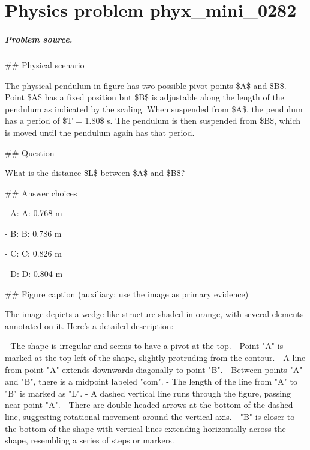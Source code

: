 
\chapter{Physics problem phyx\_mini\_0282}
\label{ch:PhyXMiniProblems_problem_phyx_mini_0282}

\paragraph{Problem source.}
\#\# Physical scenario

The physical pendulum in figure has two possible pivot points \$A\$ and \$B\$. Point \$A\$ has a fixed position but \$B\$ is adjustable along the length of the pendulum as indicated by the scaling. When suspended from \$A\$, the pendulum has a period of \$T = 1.80\$ s. The pendulum is then suspended from \$B\$, which is moved until the pendulum again has that period.

\#\# Question

What is the distance \$L\$ between \$A\$ and \$B\$?

\#\# Answer choices

- A: A: 0.768 m

- B: B: 0.786 m

- C: C: 0.826 m

- D: D: 0.804 m

\#\# Figure caption (auxiliary; use the image as primary evidence)

The image depicts a wedge-like structure shaded in orange, with several elements annotated on it. Here’s a detailed description:

- The shape is irregular and seems to have a pivot at the top.
- Point "A" is marked at the top left of the shape, slightly protruding from the contour.
- A line from point "A" extends downwards diagonally to point "B".
- Between points "A" and "B", there is a midpoint labeled "com".
- The length of the line from "A" to "B" is marked as "L".
- A dashed vertical line runs through the figure, passing near point "A".
- There are double-headed arrows at the bottom of the dashed line, suggesting rotational movement around the vertical axis.
- "B" is closer to the bottom of the shape with vertical lines extending horizontally across the shape, resembling a series of steps or markers.

